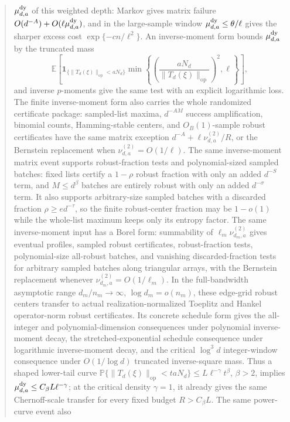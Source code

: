 \documentclass[11pt]{amsart}
\numberwithin{equation}{section}
\theoremstyle{definition}
\theoremstyle{remark}
\newcommand{\op}{\mathrm{op}}
\newcommand{\Prob}{\mathbb P}
\begin{document}
\begin{abstract}
\(\mu_{d,a}^{\rm dy}\) of this weighted depth: Markov gives matrix failure
\(O(d^{-A})+O(\ell\mu_{d,a}^{\rm dy})\), and in the large-sample window
\(\mu_{d,a}^{\rm dy}\le\theta/\ell\) gives the sharper excess cost
\(\exp\{-c n/\ell^2\}\).  An inverse-moment form bounds
\(\mu_{d,a}^{\rm dy}\) by the truncated mass
\[
  \mathbb E\!\left[
  \mathbf 1_{\{\|T_d(\xi)\|_{\op}<aN_d\}}
  \min\left\{\left(\frac{aN_d}{\|T_d(\xi)\|_{\op}}\right)^2,\ell\right\}
  \right],
\]
and inverse \(p\)-moments give the same test with an explicit logarithmic loss.
The finite inverse-moment form also carries the whole randomized certificate
package: sampled-list maxima, \(d^{-AM}\) success amplification, binomial counts,
Hamming-stable centers, and \(O_B(1)\)-sample robust certificates have the same
matrix exception \(d^{-A}+\ell\nu_{d,a}^{(2)}/R\), or the Bernstein replacement
when \(\nu_{d,a}^{(2)}=O(1/\ell)\).  The same inverse-moment matrix event
supports robust-fraction tests and polynomial-sized sampled batches: fixed
lists certify a \(1-\rho\) robust fraction with only an added \(d^{-S}\) term,
and \(M\le d^\beta\) batches are entirely robust with only an added
\(d^{-\sigma}\) term.  It also supports arbitrary-size sampled batches with a
discarded fraction \(\rho\ge e d^{-\tau}\), so the finite robust-center fraction
may be \(1-o(1)\) while the whole-list maximum keeps only its entropy factor.
The same inverse-moment input has a Borel form: summability of
\(\ell_m\nu_{d_m,a}^{(2)}\) gives eventual profiles, sampled robust
certificates, robust-fraction tests, polynomial-size all-robust batches, and
vanishing discarded-fraction tests for arbitrary sampled batches along
triangular arrays, with the Bernstein replacement whenever
\(\nu_{d_m,a}^{(2)}=O(1/\ell_m)\).  In the full-bandwidth asymptotic range
\(d_m/n_m\to\infty\), \(\log d_m=o(n_m)\), these edge-grid robust centers
transfer to actual realization-normalized Toeplitz and Hankel operator-norm
robust certificates.  Its concrete schedule form gives the
all-integer and polynomial-dimension consequences under polynomial
inverse-moment decay, the stretched-exponential schedule consequence under
logarithmic inverse-moment decay, and the critical \(\log^3d\) integer-window
consequence under \(O(1/\log d)\) truncated inverse-square mass.
Thus a shaped lower-tail curve
\(\Prob\{\|T_d(\xi)\|_{\op}<t aN_d\}\le L\ell^{-\gamma}t^\beta\),
\(\beta>2\), implies \(\mu_{d,a}^{\rm dy}\le C_{\beta}L\ell^{-\gamma}\);
at the critical density \(\gamma=1\), it already gives the same Chernoff-scale
transfer for every fixed budget \(R>C_\beta L\).  The same power-curve event also

\end{abstract}
\end{document}
